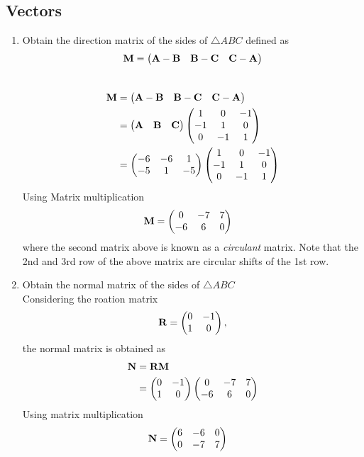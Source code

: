 \documentclass[11pt]{book}
\begin{document}
\subsection{Vectors}


\begin{enumerate}[label=\thesubsection.\arabic*.,ref=\thesubsection.\theenumi]
\item Obtain the direction matrix of the sides of $\triangle ABC$ defined as 
\begin{align}
\mathbf{M} = 	\begin{pmatrix}\mathbf{A}-\mathbf{B} & \mathbf{B}-\mathbf{C} & \mathbf{C}-\mathbf{A}\end{pmatrix}
\end{align}
\\
\solution 
\begin{align}
\mathbf{M} &= \begin{pmatrix}\mathbf{A}-\mathbf{B} & \mathbf{B}-\mathbf{C} & \mathbf{C}-\mathbf{A}\end{pmatrix} \\
	&= \begin{pmatrix}\mathbf{A} & \mathbf{B} &\mathbf{C}\end{pmatrix} \begin{pmatrix}1 & 0 & -1 \\ -1 & 1 & 0 \\ 0 & -1 & 1\end{pmatrix} \\
 &=\begin{pmatrix}-6 & -6 & 1 \\ -5 & 1 & -5\end{pmatrix}\begin{pmatrix}1 & 0 & -1 \\ -1 & 1 & 0 \\ 0 & -1 & 1\end{pmatrix} 
 \end{align}
 Using Matrix multiplication
 \begin{align}
 \mathbf{M} &=\begin{pmatrix}0 & -7 & 7 \\ -6 & 6 & 0\end{pmatrix}
\end{align}
where the second matrix above is known as a {\em circulant} matrix.  Note that the 2nd and 3rd row of the above matrix are circular shifts of the 1st row.
\item Obtain the normal matrix  of the sides of $\triangle ABC$ \\
\solution Considering the roation matrix
\begin{align}
\mathbf{R}  = \begin{pmatrix}0 & -1 \\ 1 & 0\end{pmatrix},
\end{align}
the normal matrix is obtained as
\begin{align}
\mathbf{N} &= \mathbf{R}\mathbf{M}  \\
&=\begin{pmatrix}0 & -1 \\ 1 & 0\end{pmatrix}\begin{pmatrix}0 & -7 & 7 \\ -6 & 6 & 0\end{pmatrix} 
\end{align}
Using matrix multiplication 
\begin{align}
   \vec{N} &= \myvec{6 & -6 & 0 \\ 0 & -7 & 7}

\end{align}
\end{enumerate}
\end{document}
